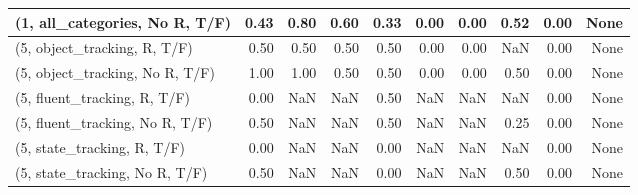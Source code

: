 \begin{table*}[h!]
\begin{adjustbox}{width=2\columnwidth,center}
\begin{tabular}{lrrr|rrr|rrr}
(1, all\_categories, No R, T/F)       &                      0.43 &                  0.80 &                      0.60 &                          0.33 &                      0.00 &                          0.00 &                                   0.52 &                               0.00 &                                  None \\



\midrule
(5, object\_tracking, R, T/F)         &                      0.50 &                  0.50 &                      0.50 &                          0.50 &                      0.00 &                          0.00 &                                    NaN &                               0.00 &                                  None \\
(5, object\_tracking, No R, T/F)      &                      1.00 &                  1.00 &                      0.50 &                          0.50 &                      0.00 &                          0.00 &                                   0.50 &                               0.00 &                                  None \\
(5, fluent\_tracking, R, T/F)         &                      0.00 &                   NaN &                       NaN &                          0.50 &                       NaN &                           NaN &                                    NaN &                               0.00 &                                  None \\
(5, fluent\_tracking, No R, T/F)      &                      0.50 &                   NaN &                       NaN &                          0.50 &                       NaN &                           NaN &                                   0.25 &                               0.00 &                                  None \\
(5, state\_tracking, R, T/F)          &                      0.00 &                   NaN &                       NaN &                          0.00 &                       NaN &                           NaN &                                    NaN &                               0.00 &                                  None \\
(5, state\_tracking, No R, T/F)       &                      0.50 &                   NaN &                       NaN &                          0.00 &                       NaN &                           NaN &                                   0.50 &                               0.00 &                                  None \\

\end{tabular}
\end{adjustbox}
\end{table*}
